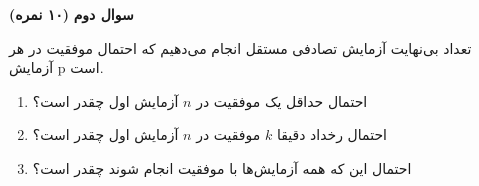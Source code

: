 \Large \textbf{سوال دوم}
\Large \textbf{(۱۰ نمره)}

\normalsize \vspace{0.5cm}

تعداد بی‌نهایت آزمایش تصادفی مستقل انجام می‌‌دهیم که احتمال موفقیت در هر آزمایش p است. 
\begin{enumerate}
	\item احتمال حداقل یک موفقیت در 
	$n$
	آزمایش اول چقدر است؟
	\item
	احتمال رخداد دقیقا 
	$k$
	موفقیت در 
	$n$
	آزمایش اول چقدر است؟ 
	\item احتمال این که همه آزمایش‌ها با موفقیت انجام شوند چقدر است؟
\end{enumerate}
